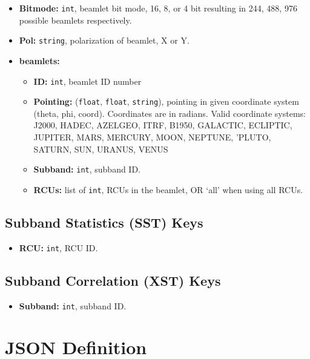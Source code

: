 \documentclass[10pt,a4paper]{article}
\begin{document}
\begin{itemize}
    \item \textbf{Bitmode:} \texttt{int}, beamlet bit mode, 16, 8, or 4 bit
    resulting in 244, 488, 976 possible beamlets respectively.
    \item \textbf{Pol:} \texttt{string}, polarization of beamlet, X or Y.
    \item \textbf{beamlets:}
    \begin{itemize}
        \item \textbf{ID:} \texttt{int}, beamlet ID number
        \item \textbf{Pointing:} (\texttt{float}, \texttt{float},
        \texttt{string}), pointing in given coordinate system (theta, phi,
        coord). Coordinates are in radians. Valid coordinate systems: J2000,
        HADEC, AZELGEO, ITRF, B1950, GALACTIC, ECLIPTIC, JUPITER, MARS, MERCURY,
        MOON, NEPTUNE, 'PLUTO, SATURN, SUN, URANUS, VENUS
        \item \textbf{Subband:} \texttt{int}, subband ID.
        \item \textbf{RCUs:} list of \texttt{int}, RCUs in the beamlet, OR `all'
        when using all RCUs.
    \end{itemize}

\end{itemize}

\subsection{Subband Statistics (SST) Keys}
\label{sec:sst_keys}

\begin{itemize}
    \item \textbf{RCU:} \texttt{int}, RCU ID.
\end{itemize}

\subsection{Subband Correlation (XST) Keys}
\label{sec:xst_keys}

\begin{itemize}
    \item \textbf{Subband:} \texttt{int}, subband ID.
\end{itemize}

\section{JSON Definition}
\end{document}
